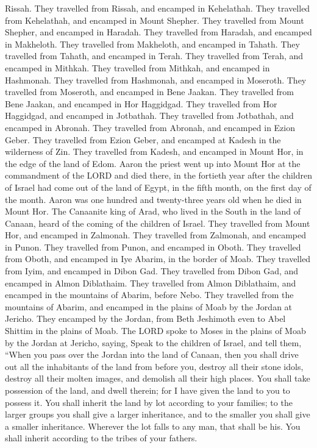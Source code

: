 Rissah.  They travelled from Rissah, and encamped in
Kehelathah.  They travelled from Kehelathah, and encamped
in Mount Shepher.  They travelled from Mount Shepher, and
encamped in Haradah.  They travelled from Haradah, and
encamped in Makheloth.  They travelled from Makheloth,
and encamped in Tahath.  They travelled from Tahath, and
encamped in Terah.  They travelled from Terah, and
encamped in Mithkah.  They travelled from Mithkah, and
encamped in Hashmonah.  They travelled from Hashmonah,
and encamped in Moseroth.  They travelled from Moseroth,
and encamped in Bene Jaakan.  They travelled from Bene
Jaakan, and encamped in Hor Haggidgad.  They travelled
from Hor Haggidgad, and encamped in Jotbathah.  They
travelled from Jotbathah, and encamped in Abronah.  They
travelled from Abronah, and encamped in Ezion Geber. 
They travelled from Ezion Geber, and encamped at Kadesh in the
wilderness of Zin.  They travelled from Kadesh, and
encamped in Mount Hor, in the edge of the land of Edom. 
Aaron the priest went up into Mount Hor at the commandment of the LORD
and died there, in the fortieth year after the children of Israel had
come out of the land of Egypt, in the fifth month, on the first day of
the month.  Aaron was one hundred and twenty-three years
old when he died in Mount Hor.  The Canaanite king of
Arad, who lived in the South in the land of Canaan, heard of the coming
of the children of Israel.  They travelled from Mount
Hor, and encamped in Zalmonah.  They travelled from
Zalmonah, and encamped in Punon.  They travelled from
Punon, and encamped in Oboth.  They travelled from Oboth,
and encamped in Iye Abarim, in the border of Moab.  They
travelled from Iyim, and encamped in Dibon Gad.  They
travelled from Dibon Gad, and encamped in Almon Diblathaim.
 They travelled from Almon Diblathaim, and encamped in
the mountains of Abarim, before Nebo.  They travelled
from the mountains of Abarim, and encamped in the plains of Moab by the
Jordan at Jericho.  They encamped by the Jordan, from
Beth Jeshimoth even to Abel Shittim in the plains of Moab.
 The LORD spoke to Moses in the plains of Moab by the
Jordan at Jericho, saying,  Speak to the children of
Israel, and tell them, ``When you pass over the Jordan into the land of
Canaan,  then you shall drive out all the inhabitants of
the land from before you, destroy all their stone idols, destroy all
their molten images, and demolish all their high places. 
You shall take possession of the land, and dwell therein; for I have
given the land to you to possess it.  You shall inherit
the land by lot according to your families; to the larger groups you
shall give a larger inheritance, and to the smaller you shall give a
smaller inheritance. Wherever the lot falls to any man, that shall be
his. You shall inherit according to the tribes of your fathers.

